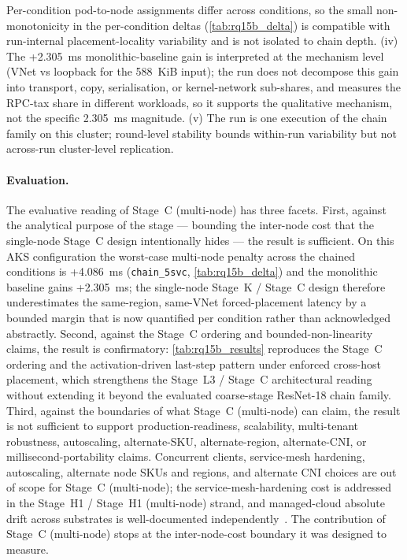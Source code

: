 Per-condition pod-to-node assignments differ across conditions, so the
small non-monotonicity in the per-condition deltas
(\cref{tab:rq15b_delta}) is compatible with run-internal placement-locality
variability and is not isolated to chain depth. (iv) The +2.305~ms
monolithic-baseline gain is interpreted at the mechanism level (VNet vs
loopback for the 588~KiB input); the run does not decompose this gain into
transport, copy, serialisation, or kernel-network sub-shares, and
\cite{rpc_overhead_hotos25} measures the RPC-tax share in different
workloads, so it supports the qualitative mechanism, not the specific
2.305~ms magnitude. (v) The run is one execution of the chain family on
this cluster; round-level stability bounds within-run variability but not
across-run cluster-level replication.

\paragraph{Evaluation.}
The evaluative reading of Stage~C (multi-node) has three facets. First, against the
analytical purpose of the stage --- bounding the inter-node cost that the
single-node Stage~C design intentionally hides --- the result is sufficient.
On this AKS configuration the worst-case multi-node penalty across the
chained conditions is +4.086~ms (\texttt{chain\_5svc},
\cref{tab:rq15b_delta}) and the monolithic baseline gains +2.305~ms; the
single-node Stage~K / Stage~C design therefore underestimates the
same-region, same-VNet forced-placement latency by a bounded margin that is
now quantified per condition rather than acknowledged abstractly. Second, against the Stage~C
ordering and bounded-non-linearity claims, the result is confirmatory:
\cref{tab:rq15b_results} reproduces the Stage~C ordering and the
activation-driven last-step pattern under enforced cross-host placement,
which strengthens the Stage~L3 / Stage~C architectural reading without
extending it beyond the evaluated coarse-stage ResNet-18 chain family.
Third, against the boundaries of what Stage~C (multi-node) can claim, the result is not
sufficient to support production-readiness, scalability, multi-tenant
robustness, autoscaling, alternate-SKU, alternate-region, alternate-CNI,
or millisecond-portability claims. Concurrent clients, service-mesh
hardening, autoscaling, alternate node SKUs and regions, and alternate
CNI choices are out of scope for Stage~C (multi-node); the service-mesh-hardening cost
is addressed in the Stage~H1 / Stage~H1 (multi-node) strand, and managed-cloud absolute
drift across substrates is well-documented
independently~\cite{managed_k8s_perf,virtualization_costs,cni_k8s_ic2e21,%
noise_in_clouds}. The contribution of Stage~C (multi-node) stops at the inter-node-cost
boundary it was designed to measure.

